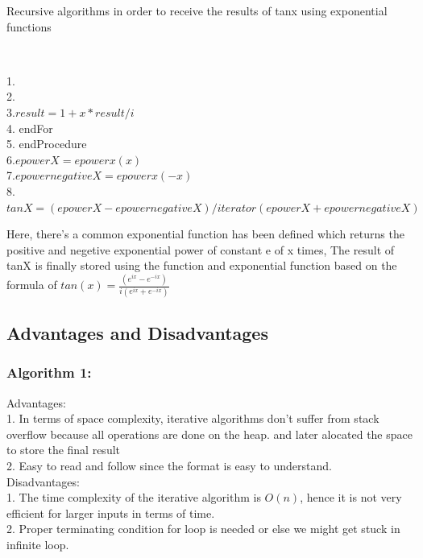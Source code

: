 \documentclass[a4paper, 11pt]{article}
\begin{document}
\begin{algorithm}
\caption{Recursive algorithms in order to receive the results of tanx using exponential functions}\\
\begin{algorithmic}
1.\\
2.\\ 
3.\State $result = 1 + x * result / i$\\
4.  endFor\\
5.  endProcedure\\
6.\State $epowerX = epowerx(x)$\\
7.\State $epowernegativeX = epowerx(-x)$\\
8.\State $tanX= (epowerX - epowernegativeX) / iterator(epowerX + epowernegativeX)$\\
\end{algorithmic}

\end{algorithm} 
Here, there's a common exponential function has been defined which returns the positive and negetive exponential power of constant e of x times,
The result of tanX is finally stored using the function and exponential function based on the formula of $tan(x) = \frac{(e^{ix}-e^{-ix})}{i(e^{ix}+e^{-ix})}$

\newpage


\subsection*{Advantages and Disadvantages}
\subsubsection*{Algorithm 1:}
Advantages:\\
1. In terms of space complexity, iterative algorithms don't suffer from stack overflow because all operations are done on the heap. and later alocated the space to store the final result \\
2. Easy to read and follow since the format is easy to understand.\\
Disadvantages:\\
1. The time complexity of the iterative algorithm is $O (n)$, hence it is not very efficient for larger inputs in terms of time.  \\
2. Proper terminating condition for loop is needed or else we might get stuck in infinite loop.
\end{document}
